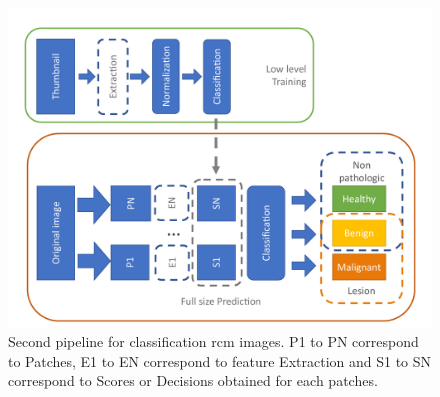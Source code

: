 \begin{figure}[h]
    \begin{center}
        \includegraphics[width=0.65\linewidth]{content/figures/Sliding.pdf}
        \caption{Second pipeline for classification \ac{rcm} images. P1 to PN correspond to Patches, E1 to EN correspond to feature Extraction and S1 to SN correspond to Scores or Decisions obtained for each patches.}
        \label{sliding}
    \end{center} 
\end{figure}